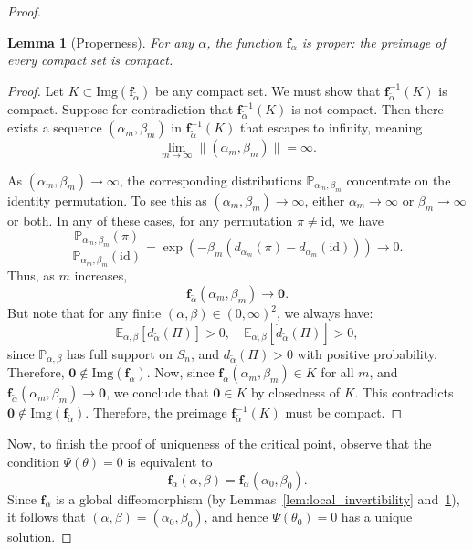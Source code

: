 \documentclass{article}
\renewcommand{\P}{\mathbb{P}}
\newtheorem{lemma}[theorem]{Lemma}     %
\begin{document}
\begin{proof}
\bigskip

\begin{lemma}[Properness]\label{lem:properness}
For any \(\alpha\), the function \(\boldsymbol{f}_{\alpha}\) is proper: the preimage of every compact set is compact.
\end{lemma}

\begin{proof}
Let \(K\subset \mathrm{Img}(\boldsymbol{f}_{\tilde\alpha})\) be any compact set.  
We must show that \(\boldsymbol{f}_{\tilde\alpha}^{-1}(K)\) is compact.
Suppose for contradiction that \(\boldsymbol{f}_{\tilde\alpha}^{-1}(K)\) is not compact.  
Then there exists a sequence \((\alpha_m,\beta_m)\) in \(\boldsymbol{f}_{\tilde\alpha}^{-1}(K)\) that escapes to infinity, meaning
\[
\lim_{m\to\infty} \|(\alpha_m,\beta_m)\| = \infty.
\]

As \((\alpha_m,\beta_m)\to\infty\), the corresponding distributions \(\P_{\alpha_m,\beta_m}\) concentrate on the identity permutation. To see this as \((\alpha_m,\beta_m) \to \infty\), either \(\alpha_m \to \infty\) or \(\beta_m \to \infty\) or both. In any of these cases, for any permutation \(\pi \neq \mathrm{id}\), we have
\[
\frac{\P_{\alpha_m,\beta_m}(\pi)}{\P_{\alpha_m,\beta_m}(\mathrm{id})} = \exp\left( -\beta_m ( d_{\alpha_m}(\pi) - d_{\alpha_m}(\mathrm{id}) ) \right) \to 0.
\] Thus, as $m$ increases,
\[
\boldsymbol{f}_{\tilde\alpha}(\alpha_m, \beta_m) \to \boldsymbol{0}.
\]
But note that for any finite \((\alpha,\beta) \in (0,\infty)^2\), we always have:
\[
\mathbb{E}_{\alpha,\beta}[d_{\tilde\alpha}(\Pi)] > 0,
\quad
\mathbb{E}_{\alpha,\beta}[\dot{d}_{\tilde\alpha}(\Pi)] > 0,
\]
since \(\P_{\alpha,\beta}\) has full support on \(S_n\), and \(d_{\tilde\alpha}(\Pi) > 0\) with positive probability.
Therefore, \(\boldsymbol{0} \notin \mathrm{Img}(\boldsymbol{f}_{\tilde\alpha})\).
Now, since \(\boldsymbol{f}_{\tilde\alpha}(\alpha_m, \beta_m) \in K\) for all \(m\), and \(\boldsymbol{f}_{\tilde\alpha}(\alpha_m, \beta_m) \to \boldsymbol{0}\), we conclude that \(\boldsymbol{0} \in K\) by closedness of \(K\).
This contradicts \(\boldsymbol{0} \notin \mathrm{Img}(\boldsymbol{f}_{\tilde\alpha})\). Therefore, the preimage \(\boldsymbol{f}_{\tilde\alpha}^{-1}(K)\) must be compact.

\end{proof}

Now, to finish the proof of uniqueness of the critical point, observe that the condition \(\Psi(\theta) = 0\) is equivalent to
\[
\boldsymbol{f}_\alpha(\alpha,\beta) = \boldsymbol{f}_\alpha(\alpha_0,\beta_0).
\]
Since \(\boldsymbol{f}_\alpha\) is a global diffeomorphism (by Lemmas~\ref{lem:local_invertibility} and~\ref{lem:properness}), it follows that \((\alpha,\beta) = (\alpha_0,\beta_0)\), and hence \(\Psi(\theta_0) = 0\) has a unique solution.


\end{proof}
\end{document}
